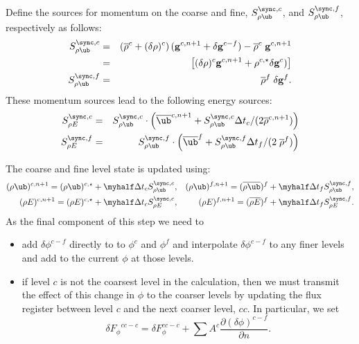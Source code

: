 \begin{itemize}
Define the \sync sources for momentum on the coarse and fine, $S^{\sync,c}_{\rho \ub}$, and
$S^{\sync,f}_{\rho \ub}$, respectively as follows:
\begin{eqnarray}
S^{\sync,c}_{\rho \ub} &=& \left(
        \overline{\rho}^c + (\delta \rho)^c \right) ({\bf g}^{c,n+1} + \delta {\bf g}^{c-f}) -
        \overline{\rho}^c                 \; {\bf g}^{c,n+1} \nonumber \\
           &=& \left[( \delta \rho)^c {\bf g}^{c,n+1} + 
                \rho^{c,\star} \delta {\bf g}^c)  \right ] \\
S^{\sync,f}_{\rho \ub} &=& \overline{\rho}^{f} \; \delta {\bf g}^f  .
\end{eqnarray}
These momentum sources lead to the following energy sources:
\begin{eqnarray}
S^{\sync,c}_{\rho E} &=& S^{\sync,c}_{\rho \ub} \cdot
         \left(   \overline{\ub}^{c,n+1} + S^{\sync,c}_{\rho \ub} \Delta t_c / (2 \overline{\rho}^{c,n+1}) \right) \\
S^{\sync,f}_{\rho E} &=& S^{\sync,f}_{\rho \ub} \cdot
         \left(
    \overline{\ub}^{f} + S^{\sync,f}_{\rho \ub} \Delta t_f / (2 \; \overline{\rho}^{f} )
         \right)
\end{eqnarray}

The coarse and fine level state is updated using:
\begin{eqnarray}
(\rho \ub)^{c,n+1} =  (\rho \ub)^{c, \star } + \myhalf \Delta t_c S^{\sync,c}_{\rho \ub} ,&&
(\rho \ub)^{f,n+1} =  (\overline{\rho \ub})^{f} + \myhalf \Delta t_f S^{\sync,f}_{\rho \ub},  \\
(\rho E)^{c,n+1} =  (\rho E)^{c, \star } + \myhalf \Delta t_c S^{\sync,c}_{\rho E} ,&&
(\rho E)^{f,n+1} =  (\overline{\rho E})^{f} + \myhalf \Delta t_f S^{\sync,f}_{\rho E}  .
\end{eqnarray}
As the final component of this step we need to 
\begin{itemize}
\item add $\delta \phi^{c-f}$ directly to 
to $\phi^{c}$ and $\phi^{f}$ and interpolate $\delta \phi^{c-f}$ to any finer
levels and add to the current $\phi$ at those levels.

\item if level $c$ is not the coarsest level in the calculation, then we must transmit the
effect of this change in $\phi$ to the coarser levels by updating the flux register between
level $c$ and the next coarser level, $cc.$ In particular, we set
\begin{equation}
\delta {F_\phi}^{cc-c} = \delta F_\phi^{cc-c} 
+ \sum A^c \frac{\partial (\delta \phi)^{c-f}}{\partial n}  .
\end{equation}
\end{itemize}

\end{itemize}
